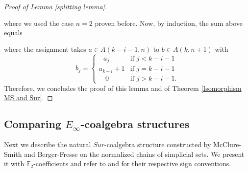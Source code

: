 \documentclass{amsart}
\newcommand{\F}{\mathbb{F}}
\theoremstyle{definition}
\begin{document}
\begin{proof}[Proof of Lemma \ref{splitting lemma}]
\begin{center}
{}
		\end{center}
		where we used the case $n=2$ proven before. Now, by induction, the sum above equals
		\begin{center}
		\end{center}
		where the assignment takes $a\in A(k-i-1,n)$ to $b\in A(k,n+1)$ with
		\begin{displaymath}
		b_j = 
		\begin{cases}
		\ \ \ a_j & \text{if } j < k-i-1 \\
		a_{k-i}+1 & \text{if } j = k-i-1 \\
		\ \ \ \; 0 & \text{if } j > k-i-1.
		\end{cases}
		\end{displaymath}
		Therefore, we concludes the proof of this lemma and of Theorem \ref{Isomorphism MS and Sur}.
	\end{proof}
	
	\subsection{Comparing $E_\infty$-coalgebra structures}
	
	Next we describe the natural $Sur$-coalgebra structure constructed by McClure-Smith and Berger-Fresse on the normalized chains of simplicial sets. We present it with $\F_2$-coefficients and refer to \cite{mcclure2003multivariable} and \cite{berger2004combinatorial} for their respective sign conventions. 
	
\end{document}
